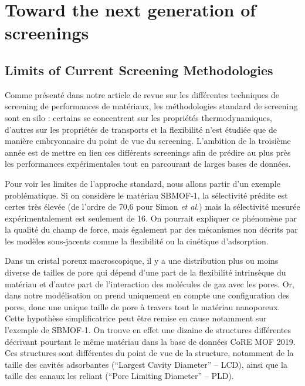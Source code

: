 \documentclass[main]{subfiles}
\begin{document}
\chapter{Toward the next generation of screenings}
\vspace*{-1\baselineskip}

\section{Limits of Current Screening Methodologies}

Comme présenté dans notre article de revue sur les différentes techniques de screening de performances de matériaux,\autocite{Ren_2022} les méthodologies standard de screening sont en silo : certains se concentrent sur les propriétés thermodynamiques, d'autres sur les propriétés de transports et la flexibilité n'est étudiée que de manière embryonnaire du point de vue du screening. L'ambition de la troisième année est de mettre en lien ces différents screenings afin de prédire au plus près les performances expérimentales tout en parcourant de larges bases de données. 

Pour voir les limites de l'approche standard, nous allons partir d'un exemple problématique. Si on considère le matériau SBMOF-1,\autocite{Banerjee_2016} la sélectivité prédite est certes très élevée (de l'ordre de 70,6 pour Simon \emph{et al.}) mais la sélectivité mesurée expérimentalement est seulement de 16. On pourrait expliquer ce phénomène par la qualité du champ de force, mais également par des mécanismes non décrits par les modèles sous-jacents comme la flexibilité ou la cinétique d'adsorption.

Dans un cristal poreux macroscopique, il y a une distribution plus ou moins diverse de tailles de pore qui dépend d'une part de la flexibilité intrinsèque du matériau et d'autre part de l'interaction des molécules de gaz avec les pores. Or, dans notre modélisation on prend uniquement en compte une configuration des pores, donc une unique taille de pore à travers tout le matériau nanoporeux. Cette hypothèse simplificatrice peut être remise en cause notamment sur l'exemple de SBMOF-1. On trouve en effet une dizaine de structures différentes décrivant pourtant le même matériau dans la base de données CoRE MOF 2019. Ces structures sont différentes du point de vue de la structure, notamment de la taille des cavités adsorbantes (``Largest Cavity Diameter'' -- LCD), ainsi que la taille des canaux les reliant (``Pore Limiting Diameter'' -- PLD). 
\end{document}

